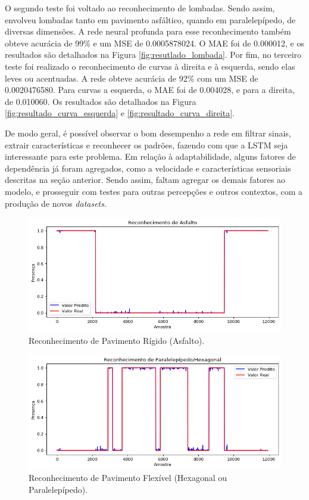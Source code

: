 O segundo teste foi voltado ao reconhecimento de lombadas. Sendo assim, envolveu lombadas tanto em pavimento asfáltico, quando em paralelepípedo, de diversas dimensões. A rede neural profunda para esse reconhecimento também obteve acurácia de 99\% e um MSE de 0.0005878024. O MAE foi de 0.000012, e os resultados são detalhados na Figura \ref{fig:resutlado_lombada}. Por fim, no terceiro teste foi realizado o reconhecimento de curvas à direita e à esquerda, sendo elas leves ou acentuadas. A rede obteve acurácia de 92\% com um MSE de 0.0020476580. Para curvas a esquerda, o MAE foi de 0.004028, e para a direita, de 0.010060. Os resultados são detalhados na Figura \ref{fig:resultado_curva_esquerda} e \ref{fig:resultado_curva_direita}.

De modo geral, é possível observar o bom desempenho a rede em filtrar sinais, extrair características e reconhecer os padrões, fazendo com que a LSTM seja interessante para este problema. Em relação à adaptabilidade, alguns fatores de dependência já foram agregados, como a velocidade e características sensoriais descritas na seção anterior. Sendo assim, faltam agregar os demais fatores ao modelo, e prosseguir com testes para outras percepções e outros contextos, com a produção de novos \textit{datasets}.

\begin{figure}[h!]
  \centering
  \caption{Reconhecimento de Pavimento Rígido (Asfalto).}
   \label{fig:resultado_asfalto}
   \includegraphics[width=1\textwidth]{figuras/fig4_2_1.png}
\end{figure}

\begin{figure}[h!]
  \centering
  \caption{Reconhecimento de Pavimento Flexível (Hexagonal ou Paralelepípedo).}
   \label{fig:resultado_paralelepipedo}
   \includegraphics[width=1\textwidth]{figuras/fig4_2_2.png}
\end{figure}

